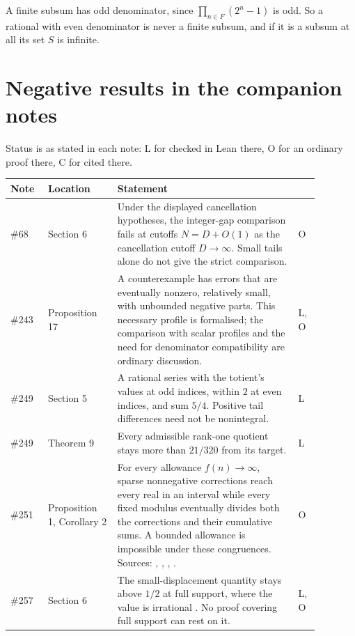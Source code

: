 \documentclass[11pt]{article}
\begin{document}
A finite subsum has odd denominator, since $\prod_{n\in F}(2^n-1)$ is odd.  So a
rational with even denominator is never a finite subsum, and if it is a subsum
at all its set $S$ is infinite.

\section{Negative results in the companion notes}\label{sec:inventory}

Status is as stated in each note: L for checked in Lean there, O for an
ordinary proof there, C for cited there.

\begin{longtable}{p{0.10\linewidth}p{0.20\linewidth}p{0.52\linewidth}p{0.06\linewidth}}
\hline
Note & Location & Statement & \\
\hline
\#68 \cite{plectis68} & Section 6 & Under the displayed cancellation hypotheses, the integer-gap comparison fails at cutoffs $N=D+O(1)$ as the cancellation cutoff $D\to\infty$.  Small tails alone do not give the strict comparison. & O \\
\#243 \cite{plectis243} & Proposition 17 & A counterexample has errors that are eventually nonzero, relatively small, with unbounded negative parts.  This necessary profile is formalised; the comparison with scalar profiles and the need for denominator compatibility are ordinary discussion. & L, O \\
\#249 \cite{plectis249} & Section 5 & A rational series with the totient's values at odd indices, within $2$ at even indices, and sum $5/4$.  Positive tail differences need not be nonintegral. & L \\
\#249 \cite{plectis249} & Theorem 9 & Every admissible rank-one quotient stays more than $21/320$ from its target. & L \\
\#251 \cite{plectis251} & Proposition 1, Corollary 2 & For every allowance $f(n)\to\infty$, sparse nonnegative corrections reach every real in an interval while every fixed modulus eventually divides both the corrections and their cumulative sums.  A bounded allowance is impossible under these congruences.  Sources: \cite{fridy1966}, \cite[Lemma~4]{crmarickovac2025}, \cite[Lemma~5.1]{kovactao2024}, \cite{vandoornkovac2025}. & O \\
\#257 \cite{plectis257} & Section 6 & The small-displacement quantity stays above $1/2$ at full support, where the value is irrational \cite{erdos1948}.  No proof covering full support can rest on it. & L, O \\

\end{longtable}
\end{document}
